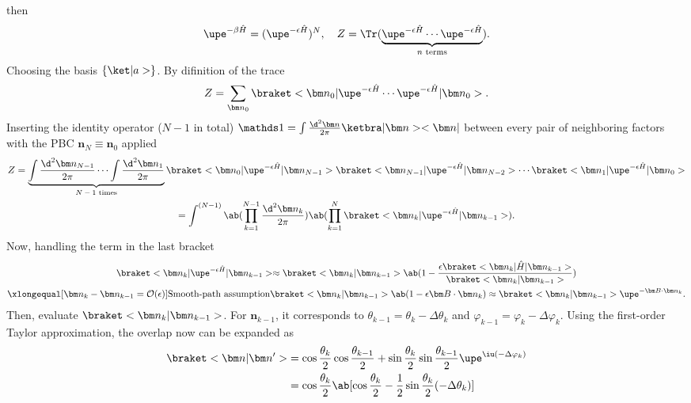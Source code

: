 \begin{solution}
\begin{enumext}
    then
    \[
      \upe^{-\beta\hat H} = (\upe^{-\epsilon\hat H})^N,\quad
      Z = \Tr(\underbrace{\upe^{-\epsilon\hat H} \cdots \upe^{-\epsilon\hat H}}_
        \text{$n$ terms}).
    \]
    Choosing the basis $\{\ket|a>\}$. By difinition of the trace
    \[
      Z = \sum_{\bm n_0}
        \braket<\bm n_0|\upe^{-\epsilon\hat H} \cdots
          \upe^{-\epsilon\hat H}|\bm n_0>.
    \]
    Inserting the identity operator ($N - 1$ in total) $\identity
    = \int \frac{\d^2\bm n}{2\pi} \ketbra|\bm n><\bm n|$
    between every pair of neighboring factors with the
    PBC $\bm n_N \equiv \bm n_0$ applied
    \begin{multline*}
      Z = \underbrace{\int \frac{\d^2\bm n_{N-1}}{2\pi} \cdots
                      \int \frac{\d^2\bm n_1}{2\pi}}_\text{$N-1$ times}
          \braket<\bm n_0     |\upe^{-\epsilon\hat H} |\bm n_{N-1}>
          \braket<\bm n_{N-1} |\upe^{-\epsilon\hat H} |\bm n_{N-2}> \cdots
          \braket<\bm n_1     |\upe^{-\epsilon\hat H} |\bm n_0>\\
        = \int^{(N-1)} \ab(\prod_{k=1}^{N-1} \frac{\d^2\bm n_k}{2\pi})
          \ab(\prod_{k=1}^N
            \braket<\bm n_k|\upe^{-\epsilon\hat H}|\bm n_{k-1}>).
    \end{multline*}
    Now, handling the term in the last bracket
    \begin{multline*}
      \braket<\bm n_k|\upe^{-\epsilon\hat H}|\bm n_{k-1}> \approx
      \braket<\bm n_k|\bm n_{k-1}> \ab(1 -
        \frac{\epsilon\braket<\bm n_k|\hat H|\bm n_{k-1}>}
          {\braket<\bm n_k|\bm n_{k-1}>})\\
      \xlongequal[\bm n_k - \bm n_{k-1} = \mathcal O(\epsilon)]
        {\text{Smooth-path assumption}}
      \braket<\bm n_k|\bm n_{k-1}> \ab(1 - \epsilon \bm B \cdot \bm n_k)
      \approx \braket<\bm n_k|\bm n_{k-1}> \upe^{-\bm B\cdot\bm n_k}.
    \end{multline*}
    Then, evaluate $\braket<\bm n_k|\bm n_{k-1}>$. For $\bm n_{k-1}$, it
    corresponds to $\theta_{k-1} = \theta_k - \Delta\theta_k$
    and $\varphi_{k-1} = \varphi_k - \Delta\varphi_k$.
    Using the first-order Taylor approximation,
    the overlap now can be expanded as
    \begin{align*}
      \braket<\bm n|\bm n'> &
    = \cos\frac{\theta_k}{2} \cos\frac{\theta_{k-1}}{2}
      + \sin\frac{\theta_k}{2} \sin\frac{\theta_{k-1}}{2}
      \upe^{\iu(-\Delta\varphi_k)}\\
    & = \cos\frac{\theta_k}{2} \ab[\cos\frac{\theta_k}{2}
      - \frac12\sin\frac{\theta_k}{2}(-\Delta\theta_k)]

\end{align*}
\end{enumext}
\end{solution}
